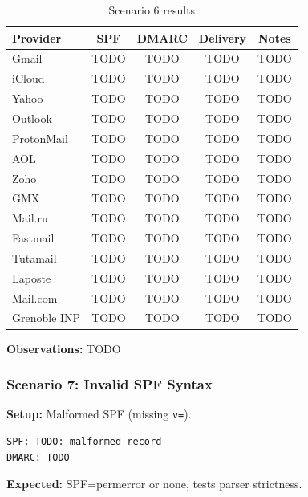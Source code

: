 \documentclass[11pt,a4paper]{article}
\begin{document}
\begin{table}[h]
\centering
\small
\begin{tabular}{lcccc}
\toprule
\textbf{Provider} & \textbf{SPF} & \textbf{DMARC} & \textbf{Delivery} & \textbf{Notes} \\
\midrule
Gmail & TODO & TODO & TODO & TODO \\
iCloud & TODO & TODO & TODO & TODO \\
Yahoo & TODO & TODO & TODO & TODO \\
Outlook & TODO & TODO & TODO & TODO \\
ProtonMail & TODO & TODO & TODO & TODO \\
AOL & TODO & TODO & TODO & TODO \\
Zoho & TODO & TODO & TODO & TODO \\
GMX & TODO & TODO & TODO & TODO \\
Mail.ru & TODO & TODO & TODO & TODO \\
Fastmail & TODO & TODO & TODO & TODO \\
Tutamail & TODO & TODO & TODO & TODO \\
Laposte & TODO & TODO & TODO & TODO \\
Mail.com & TODO & TODO & TODO & TODO \\
Grenoble INP & TODO & TODO & TODO & TODO \\
\bottomrule
\end{tabular}
\caption{Scenario 6 results}
\end{table}

\textbf{Observations:} TODO


\subsubsection{Scenario 7: Invalid SPF Syntax}

\textbf{Setup:} Malformed SPF (missing \texttt{v=}).

\begin{lstlisting}
SPF: TODO: malformed record
DMARC: TODO
\end{lstlisting}

\textbf{Expected:} SPF=permerror or none, tests parser strictness.
\end{document}
